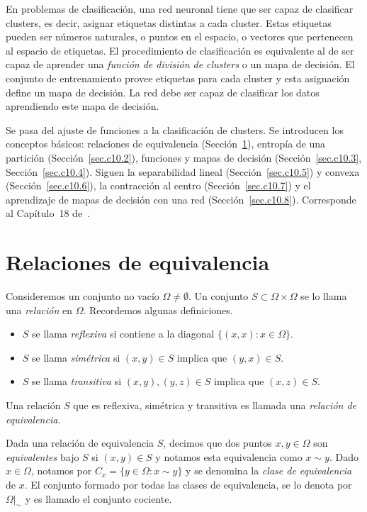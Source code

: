 \documentclass[12pt, a4paper]{amsbook}
\theoremstyle{remark}
\theoremstyle{definition}
\numberwithin{section}{chapter}
\numberwithin{subsection}{section}
\numberwithin{equation}{section}
\numberwithin{figure}{chapter}
\begin{document}
En problemas de clasificación, una red neuronal tiene que ser capaz de clasificar clusters, es decir, asignar etiquetas distintas a cada cluster. Estas etiquetas pueden ser números naturales, o puntos en el espacio, o vectores que pertenecen al espacio de etiquetas. El procedimiento de clasificación es equivalente al de ser capaz de aprender una {\em función de división de clusters} o un mapa de decisión. El conjunto de entrenamiento provee etiquetas para cada cluster y esta asignación define un mapa de decisión. La red debe ser capaz de clasificar los datos aprendiendo este mapa de decisión.

Se pasa del ajuste de funciones a la clasificación de clusters. Se introducen los conceptos básicos: relaciones de equivalencia (Sección~\ref{sec.c10.1}), entropía de una partición (Sección~\ref{sec.c10.2}), funciones y mapas de decisión (Sección~\ref{sec.c10.3}, Sección~\ref{sec.c10.4}). Siguen la separabilidad lineal (Sección~\ref{sec.c10.5}) y convexa (Sección~\ref{sec.c10.6}), la contracción al centro (Sección~\ref{sec.c10.7}) y el aprendizaje de mapas de decisión con una red (Sección~\ref{sec.c10.8}). Corresponde al Capítulo~18 de~\cite{Calin}.

\section{Relaciones de equivalencia}\label{sec.c10.1}

Consideremos un conjunto no vacío $\Omega\neq \emptyset$. Un conjunto $S\subset \Omega\times \Omega$ se lo llama una {\em relación} en $\Omega$. Recordemos algunas definiciones.
\begin{itemize}
\item[(i)] $S$ se llama {\em reflexiva} si contiene a la diagonal $\{(x, x)\colon x\in \Omega\}$.

\item[(ii)] $S$ se llama {\em simétrica} si $(x, y)\in S$ implica que $(y, x)\in S$.

\item[(iii)] $S$ se llama {\em transitiva} si $(x, y), (y, z)\in S$ implica que $(x, z)\in S$.
\end{itemize}

Una relación $S$ que es reflexiva, simétrica y transitiva es llamada una {\em relación de equivalencia}.

Dada una relación de equivalencia $S$, decimos que dos puntos $x, y\in \Omega$ son {\em equivalentes} bajo $S$ si $(x, y)\in S$ y notamos esta equivalencia como $x\sim y$. Dado $x\in \Omega$, notamos por $C_x = \{y\in \Omega\colon x\sim y\}$ y se denomina la {\em clase de equivalencia} de $x$. El conjunto formado por todas las clases de equivalencia, se lo denota por $\Omega|_\sim$ y es llamado el conjunto cociente.
\end{document}
